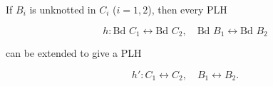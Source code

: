 If $B_i$ is unknotted in $C_i$ ($i = 1, 2$), then every PLH

$$h: \text{Bd } C_1 \leftrightarrow \text{Bd } C_2, \quad \text{Bd } B_1 \leftrightarrow \text{Bd } B_2$$

can be extended to give a PLH

$$h': C_1 \leftrightarrow C_2, \quad B_1 \leftrightarrow B_2.$$
